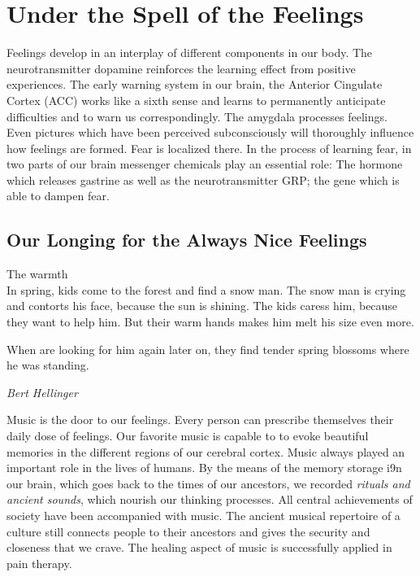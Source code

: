 \documentclass[../Book.Stress_regulation.tex]{subfiles}
\begin{document}
\chapter{Under the Spell of the Feelings}

Feelings develop in an interplay of different components in our body.
The neurotransmitter dopamine reinforces the learning effect from positive experiences.
The early warning system in our brain, the Anterior Cingulate Cortex (ACC)
works like a sixth sense and learns to permanently anticipate difficulties and to warn us correspondingly.
The amygdala processes feelings.
Even pictures which have been perceived subconsciously will thoroughly influence how feelings are formed.
Fear is localized there.
In the process of learning fear, in two parts of our brain messenger chemicals play an essential role:
The hormone which releases gastrine as well as the neurotransmitter GRP; the gene which is able to dampen fear.

\section{Our Longing for the Always Nice Feelings}


\setlength{}

\epigraph{The warmth \\ \vspace{5mm}
  In spring, kids come to the forest and find a snow man.
  The snow man is crying and contorts his face, because the sun is shining.
  The kids caress him, because they want to help him.
  But their warm hands makes him melt his size even more.

  When are looking for him again later on, they find tender spring blossoms where he was standing.}{\textit{Bert Hellinger}}
\setlength{}

Music is the door to our feelings.
Every person can prescribe themselves their daily dose of feelings.
Our favorite music is capable to to evoke beautiful memories in the different regions of our cerebral cortex.
Music always played an important role in the lives of humans.
By the means of the memory storage i9n our brain, which goes back to the times of our ancestors,
we recorded \emph{rituals and ancient sounds}, which nourish our thinking processes.
All central achievements of society have been accompanied with music.
The ancient musical repertoire of a culture still connects people to their ancestors and gives the security and closeness that we crave.
The healing aspect of music is successfully applied in pain therapy.
\end{document}

